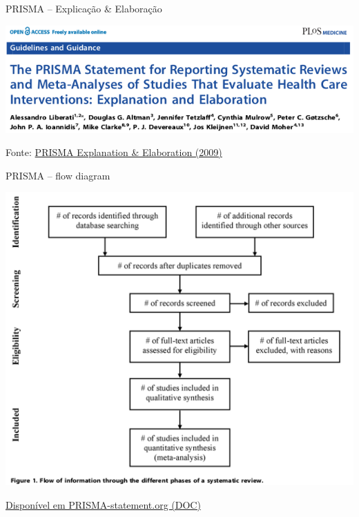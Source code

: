 \documentclass{beamer}
\begin{document}
\begin{frame}{PRISMA -- Explicação \& Elaboração}
  \begin{center}
    \includegraphics[width=\textwidth]{Revisao_resumo/PRISMA-EE}
  \end{center}

  \vfill
  \scriptsize
  \hfill Fonte: \href{https://doi.org/10.1371/journal.pmed.1000100}
  {\tiny PRISMA Explanation \& Elaboration (2009)}
\end{frame}

\begin{frame}{PRISMA -- flow diagram}
  \begin{center}
    \includegraphics[height=.8\textheight]{Revisao_resumo/PRISMA-flow}
  \end{center}

  \vfill
  \scriptsize
  \hfill \href{http://www.prisma-statement.org/}
  {\tiny Disponível em PRISMA-statement.org (DOC)}
\end{frame}
\end{document}
